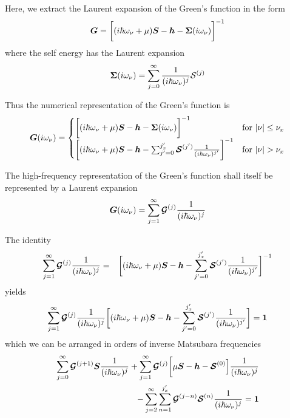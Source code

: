 \documentclass[11pt,a4paper]{report}
\begin{document}
Here, we extract the Laurent expansion of the Green's function in the form
\begin{eqnarray}
\bm{G}=\biggl[(i\hbar\omega_\nu+\mu)\bm{S}
-\bm{h}-\bm{\Sigma}(i\omega_\nu)\biggr]^{-1}
\end{eqnarray}
where the self energy has the Laurent expansion
\begin{eqnarray}
\bm{\Sigma}(i\omega_\nu)
=\sum_{j=0}^\infty\frac{1}{(i\hbar\omega_\nu)^j}\mathcal{S}^{(j)}
\end{eqnarray}

Thus the numerical representation of the Green's function is
\begin{eqnarray}
\mat{G}(i\omega_\nu)=
\begin{cases}
\biggl[(i\hbar\omega_\nu+\mu)\mat{S}
-\mat{h}-\mat{\Sigma}(i\omega_\nu)\biggr]^{-1}
&\text{for $|\nu|\le\nu_x$}\\
\biggl[(i\hbar\omega_\nu+\mu)\mat{S}
-\mat{h}-\sum_{j'=0}^{j_x'}\mat{\mathcal{S}}^{(j')}\frac{1}{(i\hbar\omega_\nu)^{j'}}
\biggr]^{-1}
&\text{for $|\nu|>\nu_x$}
\end{cases}
\end{eqnarray}


The high-frequency representation of the Green's function shall itself
be represented by a Laurent expansion
\begin{eqnarray}
\bm{G}(i\omega_\nu)=\sum_{j=1}^\infty\bm{\mathcal{G}}^{(j)}
\frac{1}{(i\hbar\omega_\nu)^j}
\end{eqnarray}

The identity 
\begin{eqnarray}
\sum_{j=1}^\infty\bm{\mathcal{G}}^{(j)}
\frac{1}{(i\hbar\omega_\nu)^j}
&=&
\biggl[(i\hbar\omega_\nu+\mu)\bm{S}
-\bm{h}
-\sum_{j'=0}^{j_x'}\bm{\mathcal{S}}^{(j')}\frac{1}{(i\hbar\omega_\nu)^{j'}}
\biggr]^{-1}
\end{eqnarray}
yields
\begin{eqnarray}
\sum_{j=1}^\infty\bm{\mathcal{G}}^{(j)}
\frac{1}{(i\hbar\omega_\nu)^j}
\biggl[(i\hbar\omega_\nu+\mu)\bm{S}
-\bm{h}-\sum_{j'=0}^{j_x'}\bm{\mathcal{S}}^{(j')}\frac{1}{(i\hbar\omega_\nu)^{j'}}
\biggr]=\bm{1}
\end{eqnarray}
which we can be arranged in orders of inverse Matsubara frequencies
\begin{eqnarray}
\sum_{j=0}^\infty\bm{\mathcal{G}}^{(j+1)}\bm{S}\frac{1}{(i\hbar\omega_\nu)^j}
+
\sum_{j=1}^\infty\bm{\mathcal{G}}^{(j)}
\biggl[\mu\bm{S}-\bm{h}-\bm{\mathcal{S}}^{(0)}\Bigr]
\frac{1}{(i\hbar\omega_\nu)^j}
\nonumber\\
-\sum_{j=2}^\infty
\sum_{n=1}^{j_x'}\bm{\mathcal{G}}^{(j-n)}\bm{\mathcal{S}}^{(n)}
\frac{1}{(i\hbar\omega_\nu)^j}
=\bm{1}
\end{eqnarray}
\end{document}
